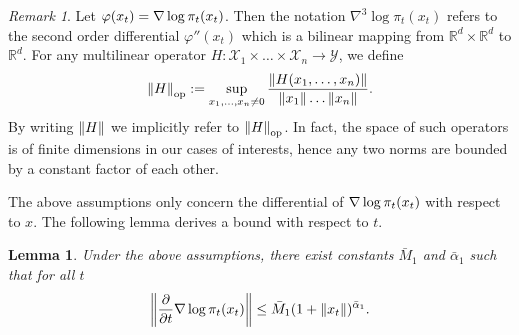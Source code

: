 \documentclass{article}
\theoremstyle{plain}
\newtheorem{lemma}[theorem]{Lemma}
\theoremstyle{definition}
\theoremstyle{remark}
\newtheorem{remark}[theorem]{Remark}
\begin{document}
\newcommand{\opnorm}[1]{\norm{#1}_{\operatorname{op}}}
\begin{remark}
	Let $\varphi(x_t) = \nabla\log \pi_t(x_t)$. Then the notation $\nabla^3\log\pi_t(x_t)$ refers to the second order differential $\varphi''(x_t)$ which is a bilinear mapping from $\mathbb R^d \times \mathbb R^d$ to $\mathbb R^d$. For any multilinear operator $H: \mathcal X_1 \times \ldots \times \mathcal X_n \to \mathcal Y$, we define
	\begin{equation*}
		\opnorm{H}:= \sup_{x_1, \ldots, x_n \neq 0} \frac{\norm{H(x_1, \ldots, x_n)}}{\norm{x_1} \ldots \norm{x_n}}.
	\end{equation*}
	By writing $\norm{H}$ we implicitly refer to $\opnorm{H}$. In fact, the space of such operators is of finite dimensions in our cases of interests, hence any two norms are bounded by a constant factor of each other.
\end{remark}
The above assumptions only concern the differential of $\nabla\log \pi_t(x_t)$ with respect to $x$. The following lemma derives a bound with respect to $t$.
\begin{lemma}
	\label{lem:partial_t_gradlog}
	Under the above assumptions, there exist constants $\bar M_1$ and $\bar \alpha_1$ such that for all $t$
	\begin{equation*}
		\norm{\frac{\partial}{\partial t} \nabla\log \pi_t(x_t)} \leq \bar M_1 (1+\norm{x_t})^{\bar \alpha_1}.
	\end{equation*}
\end{lemma}
\end{document}
